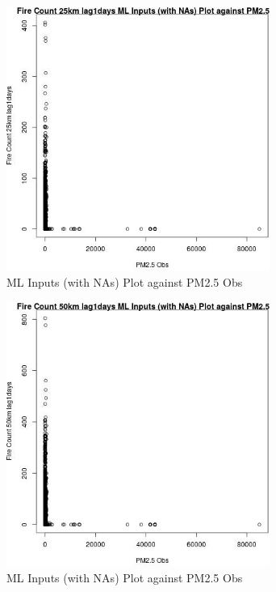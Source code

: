 \begin{figure} 
\centering  
\includegraphics[width=0.77\textwidth]{Code_Outputs/Report_ML_input_PM25_Step4_part_f_de_duplicated_aveswNAs_Fire_Count_25km_lag1daysvPM25_Obs.jpg} 
\caption{\label{fig:Report_ML_input_PM25_Step4_part_f_de_duplicated_aveswNAsFire_Count_25km_lag1daysvPM25_Obs}ML Inputs (with NAs) Plot against PM2.5 Obs} 
\end{figure} 
 

\begin{figure} 
\centering  
\includegraphics[width=0.77\textwidth]{Code_Outputs/Report_ML_input_PM25_Step4_part_f_de_duplicated_aveswNAs_Fire_Count_50km_lag1daysvPM25_Obs.jpg} 
\caption{\label{fig:Report_ML_input_PM25_Step4_part_f_de_duplicated_aveswNAsFire_Count_50km_lag1daysvPM25_Obs}ML Inputs (with NAs) Plot against PM2.5 Obs} 
\end{figure} 
 

